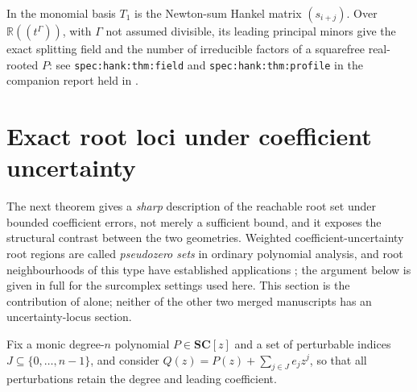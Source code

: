 \documentclass[11pt,letterpaper]{article}
\numberwithin{equation}{section}
\theoremstyle{definition}
\theoremstyle{remark}\newtheorem{remark}[theorem]{Remark}
\newcommand{\SC}{\mathbf{SC}}
\newcommand{\R}{\mathbb R}
\begin{document}
In the monomial basis $T_1$ is the Newton-sum Hankel matrix $(s_{i+j})$. Over
$\R((t^\Gamma))$, with $\Gamma$ not assumed divisible, its leading principal
minors give the exact splitting field and the number of irreducible factors of
a squarefree real-rooted $P$: see \texttt{spec:hank:thm:field} and
\texttt{spec:hank:thm:profile} in the companion report held in
.

\section{Exact root loci under coefficient uncertainty}
\label{polynomial:sec:pseudozeros}
The next theorem gives a \emph{sharp} description of the reachable root set
under bounded coefficient errors, not merely a sufficient bound, and it
exposes the structural contrast between the two geometries. Weighted
coefficient-uncertainty root regions are called \emph{pseudozero sets} in
ordinary polynomial analysis, and root neighbourhoods of this type have
established applications \cite{polynomial:FaroukiHan}; the argument below is
given in full for the surcomplex settings used here. This section is the
contribution of \cite{polynomial:MsFactorization} alone; neither of the other
two merged manuscripts has an uncertainty-locus section.

Fix a monic degree-$n$ polynomial $P\in\SC[z]$ and a set of perturbable
indices $J\subseteq\{0,\ldots,n-1\}$, and consider $Q(z)=P(z)+\sum_{j\in
J}e_jz^j$, so that all perturbations retain the degree and leading
coefficient.
\end{document}
